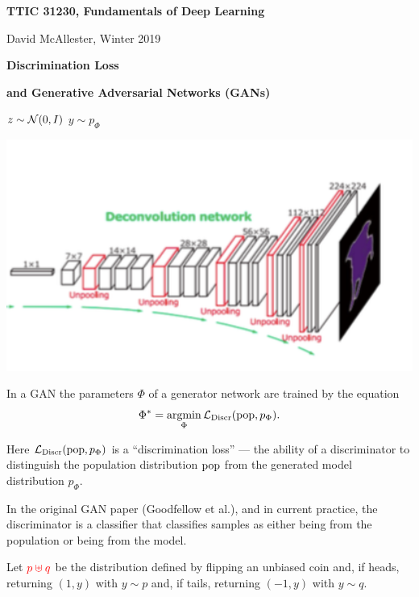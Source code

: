 





{\Huge

  \centerline{\bf TTIC 31230, Fundamentals of Deep Learning}
  \bigskip
  \centerline{David McAllester, Winter 2019}
  \vfill
  \centerline{\bf Discrimination Loss}
  \vfill
  \centerline{\bf and Generative Adversarial Networks (GANs)}
\vfill
\vfill

\centerline{$z\sim {\cal N}(0,I)$ \hspace{7em} $y\sim p_\Phi$}
\centerline{\includegraphics[width=6in]{../images/halfdeconv}}



In a GAN the parameters $\Phi$ of a generator network are trained by the equation
{\color{red} $$\Phi^* = \operatorname*{argmin}_\Phi {\cal L}_{\mathrm{Discr}}(\mathrm{pop},p_\Phi).$$}

\vfill
Here ${\cal L}_{\mathrm{Discr}}(\mathrm{pop},p_\Phi)$ is a ``discrimination loss'' --- the ability of a discriminator to distinguish the population distribution $\mathrm{pop}$ from
the generated model distribution $p_\Phi$.


\vfill
In the original GAN paper (Goodfellow et al.), and in current practice, the discriminator is a classifier that classifies samples as either being from the population or being from the model.

\vfill
Let ${\color{red} p \uplus q}$ be the distribution defined by flipping an unbiased coin and, if heads, returning {\color{red} $(1,y)$} with
{\color{red} $y \sim p$} and, if tails, returning {\color{red} $(-1,y)$} with {\color{red} $y \sim q$}.


}
